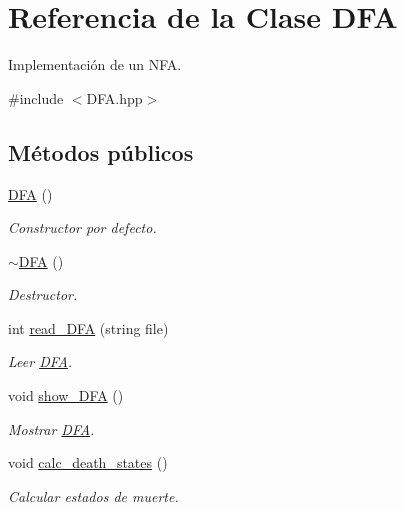 \hypertarget{class_d_f_a}{}\section{Referencia de la Clase D\+FA}
\label{class_d_f_a}


Implementación de un N\+FA.  




{\ttfamily \#include $<$D\+F\+A.\+hpp$>$}

\subsection*{Métodos públicos}
\begin{DoxyCompactItemize}
\item 
\mbox{\label{class_d_f_a_a0739bd751a325dd162604ed63fadea69}} 
\mbox{\hyperlink{class_d_f_a_a0739bd751a325dd162604ed63fadea69}{D\+FA}} ()
\begin{DoxyCompactList}\small\item\em Constructor por defecto. \end{DoxyCompactList}\item 
\mbox{\label{class_d_f_a_a39dad6c188c8cbb86ecff25423a99936}} 
\mbox{\hyperlink{class_d_f_a_a39dad6c188c8cbb86ecff25423a99936}{$\sim$\+D\+FA}} ()
\begin{DoxyCompactList}\small\item\em Destructor. \end{DoxyCompactList}\item 
int \mbox{\hyperlink{class_d_f_a_a835c3e271e3cfa828be10d92a7d8dca8}{read\+\_\+\+D\+FA}} (string file)
\begin{DoxyCompactList}\small\item\em Leer \mbox{\hyperlink{class_d_f_a}{D\+FA}}. \end{DoxyCompactList}\item 
void \mbox{\hyperlink{class_d_f_a_a3523d9fd18d415c21e36d8269ab534dd}{show\+\_\+\+D\+FA}} ()
\begin{DoxyCompactList}\small\item\em Mostrar \mbox{\hyperlink{class_d_f_a}{D\+FA}}. \end{DoxyCompactList}\item 
void \mbox{\hyperlink{class_d_f_a_a33120a3dd98a3bf89f090b98340aa644}{calc\+\_\+death\+\_\+states}} ()
\begin{DoxyCompactList}\small\item\em Calcular estados de muerte. \end{DoxyCompactList}\item 

\end{DoxyCompactItemize}
